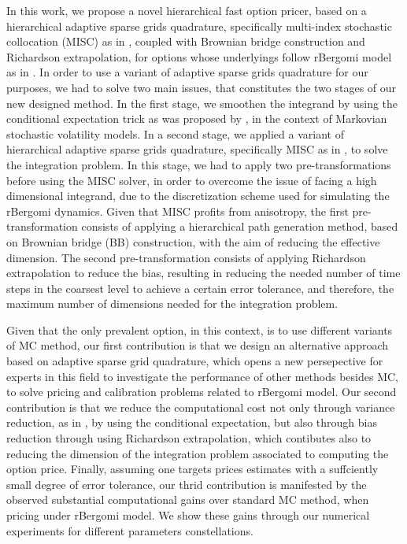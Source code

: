 In this work,  we propose a novel hierarchical fast option pricer,  based on a  hierarchical adaptive sparse grids quadrature, specifically  multi-index stochastic collocation (MISC) as in  \cite{haji2016multi}, coupled with Brownian bridge construction and Richardson extrapolation, for options whose underlyings  follow rBergomi model as in \cite{bayer2016pricing}.  In order to use a  variant of adaptive sparse grids quadrature for our purposes, we had to solve two main issues, that constitutes the two stages of our new designed method. In the first stage, we smoothen the integrand by using the conditional expectation trick as was proposed by \cite{romano1997contingent}, in the context of Markovian stochastic volatility  models.   In a second stage, we applied a variant of hierarchical adaptive sparse grids quadrature, specifically MISC as in \cite{haji2016multi}, to solve the integration problem. In this stage, we had to apply two pre-transformations before using the MISC solver, in order to overcome the issue of facing a high dimensional integrand, due to the discretization scheme used for simulating the rBergomi dynamics. Given that MISC profits from anisotropy, the first pre-transformation consists of applying a hierarchical  path generation method, based on Brownian
bridge (BB) construction, with the aim of reducing the effective dimension. The second pre-transformation consists of applying Richardson extrapolation to reduce the bias, resulting in reducing the needed number of time steps in the coarsest level to achieve a certain error tolerance, and therefore,  the maximum number of dimensions needed for the integration problem.

Given that the only prevalent option, in this context, is to use different variants of MC method, our first contribution  is that we design an alternative approach based on  adaptive sparse grid quadrature, which opens a new persepective for experts in this field to investigate the performance of other methods besides MC, to solve pricing and calibration problems related to rBergomi model. Our second contribution is that  we reduce the computational cost not only through variance reduction, as in  \cite{mccrickerd2017turbocharging}, by using the conditional expectation, but also through bias reduction through using Richardson extrapolation, which contibutes also to reducing the dimension of the integration problem associated to computing the option price. Finally, assuming one targets prices estimates with a suffciently small degree of error tolerance, our thrid contribution is manifested by the observed substantial computational gains  over standard MC method, when pricing under rBergomi model. We show  these gains through our numerical experiments for  different parameters constellations. 


